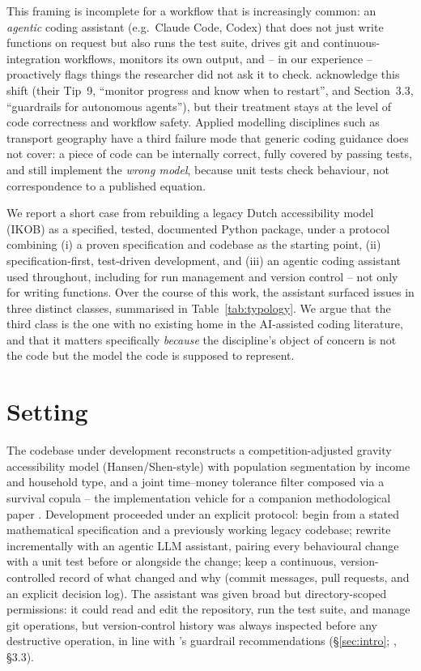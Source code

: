 \documentclass[11pt]{article}
\begin{document}
This framing is incomplete for a workflow that is increasingly common:
an \emph{agentic} coding assistant (e.g.\ Claude Code, Codex) that does
not just write functions on request but also runs the test suite,
drives git and continuous-integration workflows, monitors its own
output, and -- in our experience -- proactively flags things the
researcher did not ask it to check. \citet{bridgeford2026} acknowledge
this shift (their Tip~9, ``monitor progress and know when to restart'',
and Section~3.3, ``guardrails for autonomous agents''), but their
treatment stays at the level of code correctness and workflow safety.
Applied modelling disciplines such as transport geography have a third
failure mode that generic coding guidance does not cover: a piece of
code can be internally correct, fully covered by passing tests, and
still implement the \emph{wrong model}, because unit tests check
behaviour, not correspondence to a published equation.

We report a short case from rebuilding a legacy Dutch accessibility
model (IKOB) as a specified, tested, documented Python package, under a
protocol combining (i) a proven specification and codebase as the
starting point, (ii) specification-first, test-driven development, and
(iii) an agentic coding assistant used throughout, including for run
management and version control -- not only for writing functions. Over
the course of this work, the assistant surfaced issues in three
distinct classes, summarised in Table~\ref{tab:typology}. We argue that
the third class is the one with no existing home in the AI-assisted
coding literature, and that it matters specifically \emph{because} the
discipline's object of concern is not the code but the model the code
is supposed to represent.

\section{Setting}
\label{sec:setting}

The codebase under development reconstructs a competition-adjusted
gravity accessibility model (Hansen/Shen-style) with population
segmentation by income and household type, and a joint
time--money tolerance filter composed via a survival copula --
the implementation vehicle for a companion methodological paper
\citep{vanburgsteden-thresholds}. Development proceeded under an
explicit protocol: begin from a stated mathematical specification and a
previously working legacy codebase; rewrite incrementally with an
agentic LLM assistant, pairing every behavioural change with a unit
test before or alongside the change; keep a continuous, version-controlled
record of what changed and why (commit messages, pull requests, and an
explicit decision log). The assistant was given broad but
directory-scoped permissions: it could read and edit the repository,
run the test suite, and manage git operations, but version-control
history was always inspected before any destructive operation, in line
with \citeauthor{bridgeford2026}'s guardrail recommendations
(\S\ref{sec:intro}; \citealp{bridgeford2026}, \S3.3).
\end{document}
